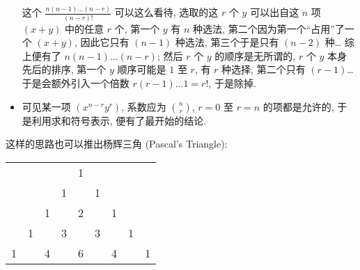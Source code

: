 \begin{tcolorbox}[size=fbox, breakable, enhanced jigsaw, title={从组合的思路出发}]
\begin{itemize}
  \begin{newquote}
  这个 $\frac{n(n-1)...(n-r)}{(n-r)!}$ 可以这么看待, 选取的这 $r$ 个
  $y$ 可以出自这 $n$ 项 $(x+y)$ 中的任意 $r$ 个, 第一个 $y$ 有
  $n$ 种选法, 第二个因为第一个``占用''了一个 $(x+y)$, 因此它只有
  $(n-1)$ 种选法, 第三个于是只有 $(n-2)$ 种\ldots{} 综上便有了
  $n(n-1)...(n-r)$; 然后 $r$ 个 $y$ 的顺序是无所谓的, $r$ 个
  $y$ 本身先后的排序, 第一个 $y$ 顺序可能是 $1$ 至 $r$, 有 $r$
  种选择, 第二个只有 $(r-1)$\ldots{} 于是会额外引入一个倍数
  $r(r-1)...1=r!$, 于是除掉.
  \end{newquote}
\item
  可见某一项 $(x^{n-r}y^r)$, 系数应为 $\binom{n}{r}$, $r=0$ 至
  $r=n$ 的项都是允许的, 于是利用求和符号表示, 便有了最开始的结论.
\end{itemize}

这样的思路也可以推出杨辉三角 (Pascal's Triangle):

\begin{tcolorbox}[size=fbox, breakable, enhanced jigsaw, sidebyside]
\begin{tabular}{lllllllll}
  &   &   &   & 1 &   &   &   &   \\
  &   &   & 1 &   & 1 &   &   &   \\
  &   & 1 &   & 2 &   & 1 &   &   \\
  & 1 &   & 3 &   & 3 &   & 1 &   \\
1 &   & 4 &   & 6 &   & 4 &   & 1
\end{tabular}
\tcblower
{}
\end{tcolorbox}


\end{tcolorbox}

